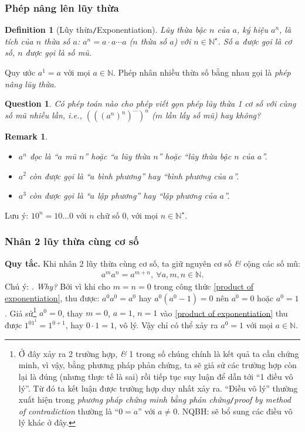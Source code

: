 \documentclass{article}
\numberwithin{equation}{section}
\newtheorem{definition}{Definition}[section]
\newtheorem{question}{Question}[section]
\newtheorem{remark}{Remark}[section]
\begin{document}
\subsubsection{Phép nâng lên lũy thừa}

\begin{definition}[Lũy thừa\texttt{/}Exponentiation]
	\emph{Lũy thừa bậc $n$} của $a$, ký hiệu $a^n$, là tích của $n$ thừa số $a$: $a^n = a\cdot a\cdots a$ ($n$ thừa số $a$) với $n\in\mathbb{N}^\star$. Số $a$ được gọi là \emph{cơ số}, $n$ được gọi là \emph{số mũ}.
\end{definition}
Quy ước $a^1 = a$ với mọi $a\in\mathbb{N}$. Phép nhân nhiều thừa số bằng nhau gọi là \textit{phép nâng lũy thừa}.

\begin{question}
	Có phép toán nào cho phép viết gọn phép lũy thừa 1 cơ số với cùng số mũ nhiều lần, i.e., $(((a^n)^n)^{\cdots})^n$ ($m$ lần lấy số mũ) hay không?
\end{question}

\begin{remark}
	\begin{itemize}
		\item $a^n$ đọc là ``$a$ mũ $n$'' hoặc ``$a$ lũy thừa $n$'' hoặc ``lũy thừa bậc $n$ của $a$''.
		\item $a^2$ còn được gọi là ``$a$ bình phương'' hay ``bình phương của $a$''.
		\item $a^3$ còn được gọi là ``$a$ lập phương'' hay ``lập phương của $a$''.
	\end{itemize}
\end{remark}
Lưu ý: $10^n = 10\ldots 0$ với $n$ chữ số 0, với mọi $n\in\mathbb{N}^\star$.

\subsubsection{Nhân 2 lũy thừa cùng cơ số}
\textbf{Quy tắc.} Khi nhân 2 lũy thừa cùng cơ số, ta giữ nguyên cơ số \textit{\&} cộng các số mũ:
\begin{align}
	\label{product of exponentiation}
	\boxed{a^ma^n = a^{m+n},\ \forall a,m,n\in\mathbb{N}.}
\end{align}
Chú ý: . \textit{Why?} Bởi vì khi cho $m = n = 0$ trong công thức \eqref{product of exponentiation}, thu được: $a^0a^0 = a^0$ hay $a^0(a^0 - 1) = 0$ nên $a^0 = 0$ hoặc $a^0 = 1$. Giả sử\footnote{Ở đây xảy ra 2 trường hợp, \textit{\&} 1 trong số chúng chính là kết quả ta cần chứng minh, vì vậy, bằng phương pháp phản chứng, ta sẽ giả sử các trường hợp còn lại là đúng (nhưng thực tế là sai) rồi tiếp tục suy luận để dẫn tới ``1 điều vô lý''. Từ đó ta kết luận được trường hợp duy nhất xảy ra. ``Điều vô lý'' thường xuất hiện trong \textit{phương pháp chứng minh bằng phản chứng}\texttt{/}\textit{proof by method of contradiction} thường là ``$0 = a$'' với $a\ne 0$. NQBH: sẽ bổ sung các điều vô lý khác ở đây.} $a^0 = 0$, thay $m = 0$, $a = 1$, $n = 1$ vào \eqref{product of exponentiation} thu được $1^01^1 = 1^{0+1}$, hay $0\cdot 1 = 1$, vô lý. Vậy chỉ có thể xảy ra $a^0 = 1$ với mọi $a\in\mathbb{N}$.
\end{document}
